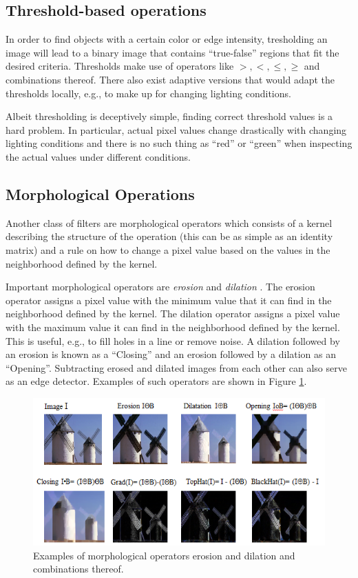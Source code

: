\subsection{Threshold-based operations}
In order to find objects with a certain color or edge intensity, tresholding an image will lead to a binary image that contains ``true-false'' regions that fit the desired criteria. Thresholds make use of operators like $>,<,\leq,\geq$ and combinations thereof. There also exist adaptive versions that would adapt the thresholds locally, e.g., to make up for changing lighting conditions.

Albeit thresholding is deceptively simple, finding correct threshold values is a hard problem. In particular, actual pixel values change drastically with changing lighting conditions and there is no such thing as ``red'' or ``green'' when inspecting the actual values under different conditions. 

\subsection{Morphological Operations}
Another class of filters are morphological operators which consists of a kernel describing the structure of the operation (this can be as simple as an identity matrix) and a rule on how to change a pixel value based on the values in the neighborhood defined by the kernel.

Important morphological operators are \emph{erosion} and \emph{dilation} . The erosion operator assigns a pixel value with the minimum value that it can find in the neighborhood defined by the kernel. The dilation operator assigns a pixel value with the maximum value it can find in the neighborhood defined by the kernel. This is useful, e.g., to fill holes in a line or remove noise. A dilation followed by an erosion is known as a ``Closing'' and an erosion followed by a dilation as an ``Opening''. Subtracting erosed and dilated images from each other can also serve as an edge detector. Examples of such operators are shown in Figure \ref{fig:morphology}.

\begin{figure}
	\centering
		\includegraphics[width=\textwidth]{figs/morphology}
	\caption{Examples of morphological operators erosion and dilation and combinations thereof.
	\label{fig:morphology}}
\end{figure}
